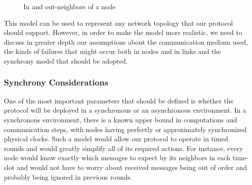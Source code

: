 \documentclass[a4paper,11pt,twoside]{report}
\begin{document}
\begin{figure}[h]
\centering
{}\hfill
{}

\caption{In and out-neighbors of a node}
\label{fig:neighbors}

\end{figure}

This model can be used to represent any network topology that our protocol should support. However, in order to make the model more realistic, we need to discuss in greater depth our assumptions about the communication medium used, the kinds of failures that might occur both in nodes and in links and the synchrony model that should be adopted. 


\subsubsection*{Synchrony Considerations}

One of the most important parameters that should be defined is whether the protocol will be deployed in a synchronous or an asynchronous environment. In a synchronous environment, there is a known upper bound in computations and communication steps, with nodes having perfectly or approximately synchronized physical clocks. Such a model would allow our protocol to operate in timed rounds and would greatly simplify all of its required actions. For instance, every node would know exactly which messages to expect by its neighbors in each time-slot and would not have to worry about received messages being out of order and probably being ignored in previous rounds.\\
\end{document}
